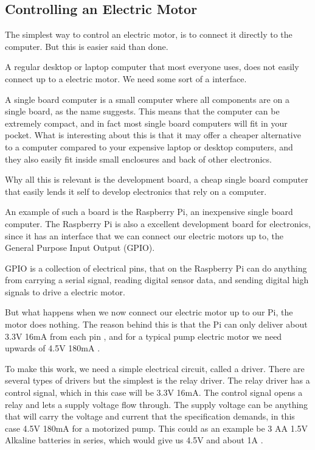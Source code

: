 \documentclass[a4paper,12pt,twoside,openright,titlepage]{book}
\begin{document}
\subsection{Controlling an Electric Motor}
The simplest way to control an electric motor, is to connect it directly to the computer. But this is easier said than done.

A regular desktop or laptop computer that most everyone uses, does not easily connect up to a electric motor. We need some sort of a interface.

A single board computer is a small computer where all components are on a single board, as the name suggests.
This means that the computer can be extremely compact, and in fact most single board computers will fit in your pocket.
What is interesting about this is that it may offer a cheaper alternative to a computer compared to your expensive laptop or desktop computers, and they also easily fit inside small enclosures and back of other electronics.

Why all this is relevant is the development board, a cheap single board computer that easily lends it self to develop electronics that rely on a computer.

An example of such a board is the Raspberry Pi, an inexpensive single board computer.
The Raspberry Pi is also a excellent development board for electronics, since it has an interface that we can connect our electric motors up to, the General Purpose Input Output (GPIO).

GPIO is a collection of electrical pins, that on the Raspberry Pi can do anything from carrying a serial signal, reading digital sensor data, and sending digital high signals to drive a electric motor.

But what happens when we now connect our electric motor up to our Pi, the motor does nothing.
The reason behind this is that the Pi can only deliver about 3.3V 16mA from each pin \cite{pi_pin_current}, and for a typical pump electric motor we need upwards of 4.5V 180mA \cite{aliexpress_pump}.

To make this work, we need a simple electrical circuit, called a driver. There are several types of drivers but the simplest is the relay driver.
The relay driver has a control signal, which in this case will be 3.3V 16mA.
The control signal opens a relay and lets a supply voltage flow through.
The supply voltage can be anything that will carry the voltage and current that the specification demands, in this case 4.5V 180mA for a motorized pump. This could as an example be 3 AA 1.5V Alkaline batteries in series, which would give us 4.5V and about 1A \cite{battery_current}.
\end{document}
